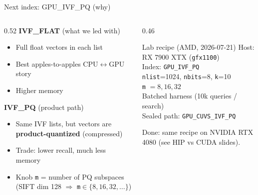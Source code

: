 \documentclass[aspectratio=169,11pt]{beamer}
\begin{document}
\begin{frame}{Next index: GPU\_IVF\_PQ (why)}
  \begin{columns}[T]
    \begin{column}{0.52\textwidth}
      \textbf{IVF\_FLAT} (what we led with)
      \begin{itemize}
        \item Full float vectors in each list
        \item Best apples-to-apples CPU$\leftrightarrow$GPU story
        \item Higher memory
      \end{itemize}
      \vspace{0.6em}
      \textbf{IVF\_PQ} (product path)
      \begin{itemize}
        \item Same IVF lists, but vectors are
              \textbf{product-quantized} (compressed)
        \item Trade: lower recall, much less memory
        \item Knob \texttt{m} = number of PQ subspaces
              (SIFT dim 128 $\Rightarrow$ \texttt{m}$\in\{8,16,32,\ldots\}$)
      \end{itemize}
    \end{column}
    \begin{column}{0.46\textwidth}
      \begin{block}{Lab recipe (AMD, 2026-07-21)}
        \footnotesize
        Host: RX 7900 XTX (\texttt{gfx1100})\\
        Index: \texttt{GPU\_IVF\_PQ}\\
        \texttt{nlist}=1024, \texttt{nbits}=8, \texttt{k}=10\\
        \texttt{m} $= 8,16,32$\\
        Batched harness (10k queries / search)\\
        Sealed path: \texttt{GPU\_CUVS\_IVF\_PQ}
      \end{block}
      \vspace{0.4em}
      {\small Done: same recipe on NVIDIA RTX 4080
      (see HIP vs CUDA slides).}
    \end{column}
  \end{columns}
\end{frame}
\end{document}
